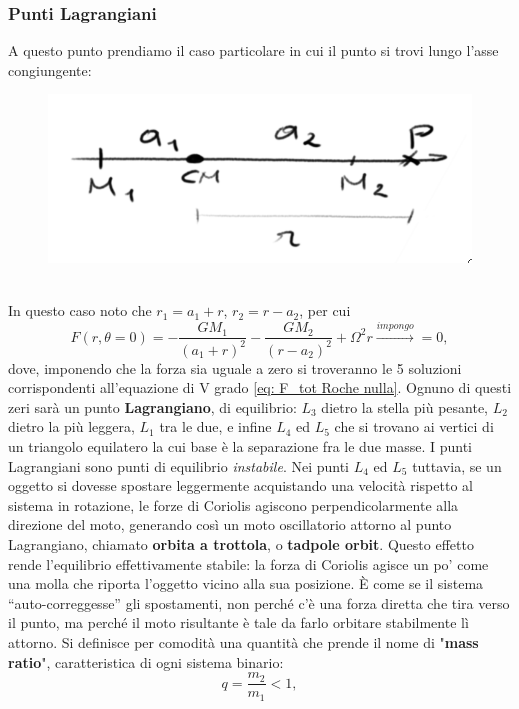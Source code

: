 \subsubsection{Punti Lagrangiani}
A questo punto prendiamo il caso particolare in cui il punto si trovi lungo l'asse congiungente:
\begin{figure}[h!]
    \centering
    \includegraphics[width=0.5\linewidth]{Immagini/potenziale di Roche lungo asse congiungente.png}
    \label{fig: Potenziale di Roche lungo congiungente}
\end{figure}\\
In questo caso noto che $r_1 = a_1 + r$, $r_2 = r - a_2$, per cui
\begin{equation}
    F(r, \theta=0)= -\frac{GM_1}{(a_1+r)^2} - \frac{GM_2}{(r-a_2)^2} + \Omega^2r \xrightarrow{impongo}=0,
    \label{eq: F_tot Roche nulla}
\end{equation}
dove, imponendo che la forza sia uguale a zero si troveranno le 5 soluzioni corrispondenti all'equazione di V grado \ref{eq: F_tot Roche nulla}. 
Ognuno di questi zeri sarà un punto \textbf{Lagrangiano}, di equilibrio:
$L_3$ dietro la stella più pesante, $L_2$ dietro la più leggera, $L_1$ tra le due, e infine $L_4$ ed $L_5$ che si trovano ai vertici di un triangolo equilatero la cui base è la separazione fra le due masse.
I punti Lagrangiani sono punti di equilibrio \textit{instabile}.
Nei punti $L_4$ ed $L_5$ tuttavia, se un oggetto si dovesse spostare leggermente acquistando una velocità rispetto al sistema in rotazione, le forze di Coriolis agiscono perpendicolarmente alla direzione del moto, generando così un moto oscillatorio attorno al punto Lagrangiano, chiamato \textbf{orbita a trottola}, o \textbf{tadpole orbit}.
Questo effetto rende l'equilibrio effettivamente stabile: la forza di Coriolis agisce un po' come una molla che riporta l'oggetto vicino alla sua posizione.
È come se il sistema “auto-correggesse” gli spostamenti, non perché c'è una forza diretta che tira verso il punto, ma perché il moto risultante è tale da farlo orbitare stabilmente lì attorno.
Si definisce per comodità una quantità che prende il nome di "\textbf{mass ratio}", caratteristica di ogni sistema binario:
\begin{equation}
    q = \frac{m_2}{m_1}<1,
\end{equation}
